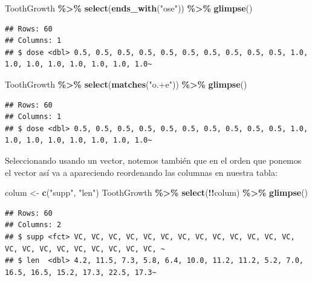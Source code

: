 \documentclass[
]{book}
\newenvironment{Shaded}{\begin{snugshade}}{\end{snugshade}}
\newcommand{\FunctionTok}[1]{\textcolor[rgb]{0.13,0.29,0.53}{\textbf{#1}}}
\newcommand{\NormalTok}[1]{#1}
\newcommand{\OtherTok}[1]{\textcolor[rgb]{0.56,0.35,0.01}{#1}}
\newcommand{\SpecialCharTok}[1]{\textcolor[rgb]{0.81,0.36,0.00}{\textbf{#1}}}
\newcommand{\StringTok}[1]{\textcolor[rgb]{0.31,0.60,0.02}{#1}}
\begin{document}
\begin{Shaded}
\begin{Highlighting}[]
\NormalTok{ToothGrowth }\SpecialCharTok{\%\textgreater{}\%} \FunctionTok{select}\NormalTok{(}\FunctionTok{ends\_with}\NormalTok{(}\StringTok{"ose"}\NormalTok{)) }\SpecialCharTok{\%\textgreater{}\%} \FunctionTok{glimpse}\NormalTok{()}
\end{Highlighting}
\end{Shaded}

\begin{verbatim}
## Rows: 60
## Columns: 1
## $ dose <dbl> 0.5, 0.5, 0.5, 0.5, 0.5, 0.5, 0.5, 0.5, 0.5, 0.5, 1.0, 1.0, 1.0, 1.0, 1.0, 1.0, 1.0, 1.0~
\end{verbatim}

\begin{Shaded}
\begin{Highlighting}[]
\NormalTok{ToothGrowth }\SpecialCharTok{\%\textgreater{}\%} \FunctionTok{select}\NormalTok{(}\FunctionTok{matches}\NormalTok{(}\StringTok{"o.+e"}\NormalTok{)) }\SpecialCharTok{\%\textgreater{}\%} \FunctionTok{glimpse}\NormalTok{()}
\end{Highlighting}
\end{Shaded}

\begin{verbatim}
## Rows: 60
## Columns: 1
## $ dose <dbl> 0.5, 0.5, 0.5, 0.5, 0.5, 0.5, 0.5, 0.5, 0.5, 0.5, 1.0, 1.0, 1.0, 1.0, 1.0, 1.0, 1.0, 1.0~
\end{verbatim}

\hfill\break
Seleccionando usando un vector, notemos también que en el orden que ponemos el vector así va a apareciendo reordenando las columnas en nuestra tabla:

\begin{Shaded}
\begin{Highlighting}[]
\NormalTok{colum }\OtherTok{\textless{}{-}} \FunctionTok{c}\NormalTok{(}\StringTok{"supp"}\NormalTok{, }\StringTok{"len"}\NormalTok{)}
\NormalTok{ToothGrowth  }\SpecialCharTok{\%\textgreater{}\%}  \FunctionTok{select}\NormalTok{(}\SpecialCharTok{!!}\NormalTok{colum) }\SpecialCharTok{\%\textgreater{}\%} \FunctionTok{glimpse}\NormalTok{()}
\end{Highlighting}
\end{Shaded}

\begin{verbatim}
## Rows: 60
## Columns: 2
## $ supp <fct> VC, VC, VC, VC, VC, VC, VC, VC, VC, VC, VC, VC, VC, VC, VC, VC, VC, VC, VC, VC, VC, VC, ~
## $ len  <dbl> 4.2, 11.5, 7.3, 5.8, 6.4, 10.0, 11.2, 11.2, 5.2, 7.0, 16.5, 16.5, 15.2, 17.3, 22.5, 17.3~
\end{verbatim}
\end{document}
